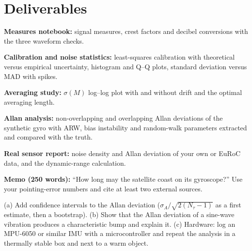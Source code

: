 \documentclass[11pt,a4paper]{article}
\begin{document}
\section*{Deliverables}
\begin{delivs}
  \item[D1] \textbf{Measures notebook:} signal measures, crest factors and decibel conversions with the three waveform checks.
  \item[D2] \textbf{Calibration and noise statistics:} least-squares calibration with theoretical versus empirical uncertainty, histogram and Q--Q plots, standard deviation versus MAD with spikes.
  \item[D3] \textbf{Averaging study:} $\sigma(M)$ log--log plot with and without drift and the optimal averaging length.
  \item[D4] \textbf{Allan analysis:} non-overlapping and overlapping Allan deviations of the synthetic gyro with ARW, bias instability and random-walk parameters extracted and compared with the truth.
  \item[D5] \textbf{Real sensor report:} noise density and Allan deviation of your own or EuRoC data, and the dynamic-range calculation.
  \item[D6] \textbf{Memo (250 words):} ``How long may the satellite coast on its gyroscope?'' Use your pointing-error numbers and cite at least two external sources.
  \item[Bonus] (a) Add confidence intervals to the Allan deviation ($\sigma_A/\sqrt{2(N_\tau-1)}$ as a first estimate, then a bootstrap). (b) Show that the Allan deviation of a sine-wave vibration produces a characteristic bump and explain it. (c) Hardware: log an MPU-6050 or similar IMU with a microcontroller and repeat the analysis in a thermally stable box and next to a warm object.
\end{delivs}
\end{document}
